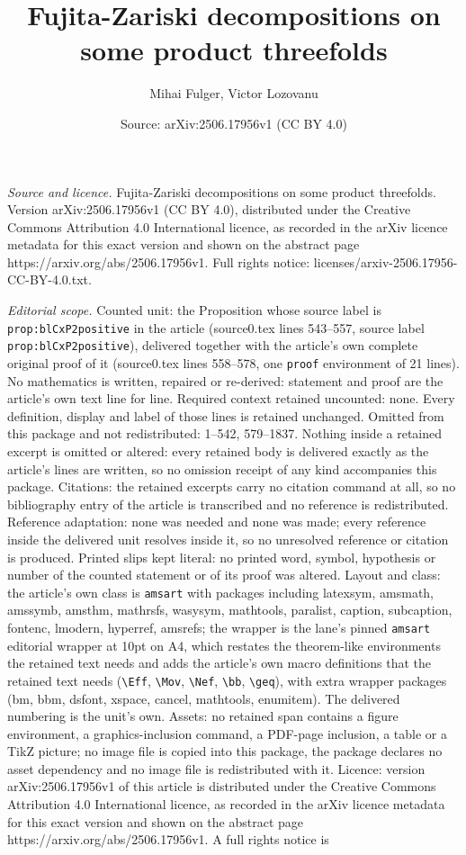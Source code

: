 \documentclass[10pt,a4paper]{amsart}
\title[Fujita-Zariski decompositions on some product threefolds]{Fujita-Zariski decompositions on some product threefolds}
\author{Mihai Fulger, Victor Lozovanu}
\date{Source: arXiv:2506.17956v1 (CC BY 4.0)}
\begin{document}
\maketitle

\noindent\emph{Source and licence.} Fujita-Zariski decompositions on some product threefolds. Version arXiv:2506.17956v1 (CC BY 4.0), distributed under the Creative Commons Attribution 4.0 International licence, as recorded in the arXiv licence metadata for this exact version and shown on the abstract page https://arxiv.org/abs/2506.17956v1. Full rights notice: licenses/arxiv-2506.17956-CC-BY-4.0.txt.\par\smallskip

\noindent\textit{Editorial scope.} Counted unit: the Proposition whose source label is \texttt{prop:blCxP2positive} in the article (source0.tex lines 543--557, source label \texttt{prop:blCxP2positive}), delivered together with the article's own complete original proof of it (source0.tex lines 558--578, one \texttt{proof} environment of 21 lines). No mathematics is written, repaired or re-derived: statement and proof are the article's own text line for line. Required context retained uncounted: none. Every definition, display and label of those lines is retained unchanged. Omitted from this package and not redistributed: 1--542, 579--1837. Nothing inside a retained excerpt is omitted or altered: every retained body is delivered exactly as the article's lines are written, so no omission receipt of any kind accompanies this package. Citations: the retained excerpts carry no citation command at all, so no bibliography entry of the article is transcribed and no reference is redistributed. Reference adaptation: none was needed and none was made; every reference inside the delivered unit resolves inside it, so no unresolved reference or citation is produced. Printed slips kept literal: no printed word, symbol, hypothesis or number of the counted statement or of its proof was altered. Layout and class: the article's own class is \texttt{amsart} with packages including latexsym, amsmath, amssymb, amsthm, mathrsfs, wasysym, mathtools, paralist, caption, subcaption, fontenc, lmodern, hyperref, amsrefs; the wrapper is the lane's pinned \texttt{amsart} editorial wrapper at 10pt on A4, which restates the theorem-like environments the retained text needs and adds the article's own macro definitions that the retained text needs (\texttt{\textbackslash Eff}, \texttt{\textbackslash Mov}, \texttt{\textbackslash Nef}, \texttt{\textbackslash bb}, \texttt{\textbackslash geq}), with extra wrapper packages (bm, bbm, dsfont, xspace, cancel, mathtools, enumitem). The delivered numbering is the unit's own. Assets: no retained span contains a figure environment, a graphics-inclusion command, a PDF-page inclusion, a table or a TikZ picture; no image file is copied into this package, the package declares no asset dependency and no image file is redistributed with it. Licence: version arXiv:2506.17956v1 of this article is distributed under the Creative Commons Attribution 4.0 International licence, as recorded in the arXiv licence metadata for this exact version and shown on the abstract page https://arxiv.org/abs/2506.17956v1. A full rights notice is 
\end{document}

